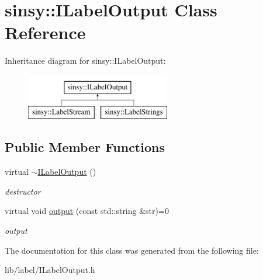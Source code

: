 \hypertarget{classsinsy_1_1ILabelOutput}{\section{sinsy\-:\-:\-I\-Label\-Output \-Class \-Reference}
\label{classsinsy_1_1ILabelOutput}
}
\-Inheritance diagram for sinsy\-:\-:\-I\-Label\-Output\-:\begin{figure}[H]
\begin{center}
\leavevmode
\includegraphics[height=2.000000cm]{classsinsy_1_1ILabelOutput}
\end{center}
\end{figure}
\subsection*{\-Public \-Member \-Functions}
\begin{DoxyCompactItemize}
\item 
\hypertarget{classsinsy_1_1ILabelOutput_a1b5605af046ca405ce143943614cca0e}{virtual \hyperlink{classsinsy_1_1ILabelOutput_a1b5605af046ca405ce143943614cca0e}{$\sim$\-I\-Label\-Output} ()}\label{classsinsy_1_1ILabelOutput_a1b5605af046ca405ce143943614cca0e}

\begin{DoxyCompactList}\small\item\em destructor \end{DoxyCompactList}\item 
\hypertarget{classsinsy_1_1ILabelOutput_a5ba6152a812e466398a45db0106a11bb}{virtual void \hyperlink{classsinsy_1_1ILabelOutput_a5ba6152a812e466398a45db0106a11bb}{output} (const std\-::string \&str)=0}\label{classsinsy_1_1ILabelOutput_a5ba6152a812e466398a45db0106a11bb}

\begin{DoxyCompactList}\small\item\em output \end{DoxyCompactList}\end{DoxyCompactItemize}


\-The documentation for this class was generated from the following file\-:\begin{DoxyCompactItemize}
\item 
lib/label/\-I\-Label\-Output.\-h\end{DoxyCompactItemize}
